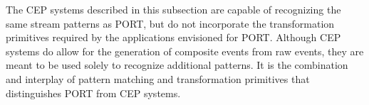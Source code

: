The CEP systems described in this subsection are capable
of recognizing the same stream patterns as PORT,
but do not incorporate the
transformation primitives 
required by the applications
envisioned for PORT. Although CEP systems do allow for the
generation of composite events from raw events,
they are meant
to be used solely to recognize additional patterns.
It is the combination and interplay of pattern matching and transformation
primitives that distinguishes PORT from CEP systems.



